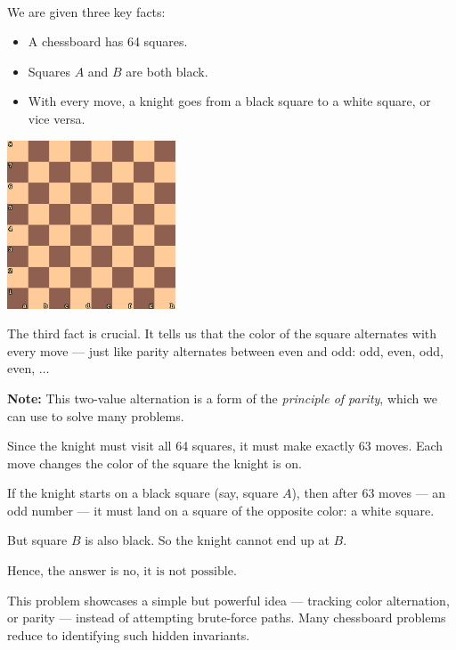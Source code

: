 \documentclass{article}
\begin{document}
\begin{soln}\ \\\indent
    We are given three key facts:
    \begin{itemize}[topsep=0pt, partopsep=0pt, itemsep=0pt]
        \item A chessboard has 64 squares.
        \item Squares \( A \) and \( B \) are both black.
        \item With every move, a knight goes from a black square to a white square, or vice versa.
    \end{itemize}

    \begin{center}
        \includegraphics[width=5cm]{./png/chess-board.png}
    \end{center}

    The third fact is crucial. It tells us that the color of the square alternates with every move — just like parity alternates between even and odd: odd, even, odd, even, \(\ldots\)

    \textbf{Note:} This two-value alternation is a form of the \emph{principle of parity}, which we can use to solve many problems.

    Since the knight must visit all 64 squares, it must make exactly \( 63 \) moves. Each move changes the color of the square the knight is on.

    If the knight starts on a black square (say, square \( A \)), then after 63 moves — an odd number — it must land on a square of the opposite color: a white square.

    But square \( B \) is also black. So the knight cannot end up at \( B \).

    Hence, the answer is 
    \(
        \boxed{\text{no, it is not possible.}}
    \)
\end{soln}

\begin{remark*}
    This problem showcases a simple but powerful idea — tracking color alternation, or parity — instead of attempting brute-force paths. Many chessboard problems reduce to identifying such hidden invariants.
\end{remark*}
\end{document}
